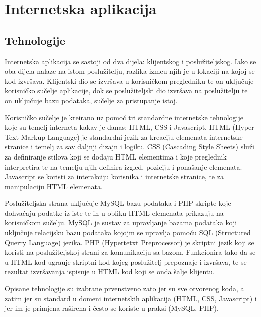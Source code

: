 \section{Internetska aplikacija}

\subsection{Tehnologije}

Internetska aplikacija se sastoji od dva dijela: klijentskog i poslu\v{z}iteljskog. Iako se oba dijela nalaze na istom poslu\v{z}itelju, razlika izme\dj u njih je u lokaciji na kojoj se kod izvr\v{s}ava. Klijentski dio se izvr\v{s}ava u korisni\v{c}kom pregledniku te on uklju\v{c}uje korisni\v{c}ko su\v{c}elje aplikacije, dok se poslu\v{z}iteljski dio izvr\v{s}ava na poslu\v{z}itelju te on uklju\v{c}uje bazu podataka, su\v{c}elje za pristupanje istoj.

Korisni\v{c}ko su\v{c}elje je kreirano uz pomo\'{c} tri standardne internetske tehnologije koje su temelj interneta kakav je danas: HTML, CSS i Javascript. HTML \cite{html} (Hyper Text Markup Language) je standardni jezik za kreaciju elemenata internetske stranice i temelj za sav daljnji dizajn i logiku. CSS \cite{css} (Cascading Style Sheets) slu\v{z}i za definiranje stilova koji se dodaju HTML elementima i koje preglednik interpretira te na temelju njih definira izgled, poziciju i pona\v{s}anje elemenata. Javascript \cite{javascript} se koristi za interakciju korisnika i internetske stranice, te za manipulaciju HTML elemenata.

Poslu\v{z}iteljska strana uklju\v{c}uje MySQL bazu podataka i PHP skripte koje dohva\'{c}aju podatke iz iste te ih u obliku HTML elemenata prikazuju na korisni\v{c}kom su\v{c}elju. MySQL je sustav za upravljanje bazama podataka koji uklju\v{c}uje relacijsku bazu podataka kojojm se upravlja pomo\'{c}u SQL (Structured Querry Language) jezika. PHP (Hypertetxt Preprocessor) je skriptni jezik koji se koristi na poslu\v{z}iteljskoj strani za komunikaciju sa bazom. Funkcionira tako da se u HTML kod ugra\dj uje skriptni kod kojeg poslu\v{z}itelj prepoznaje i izvr\v{s}ava, te se rezultat izvr\v{s}avanja ispisuje u HTML kod koji se onda \v{s}alje klijentu.

Opisane tehnologije su izabrane prvenstveno zato jer su sve otvorenog koda, a zatim jer su standard u domeni internetskih aplikacija (HTML, CSS, Javascript) i jer im je primjena ra\v{s}irena i \v{c}esto se koriste u praksi (MySQL, PHP).

